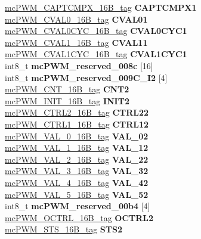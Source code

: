 \begin{DoxyCompactItemize}
\begin{tabbing}
\>\>\mbox{\hyperlink{unionmcPWM__CAPTCMPX__16B__tag}{mcPWM\_CAPTCMPX\_16B\_tag}} {\bfseries CAPTCMPX1}\\
\>\>\mbox{\hyperlink{unionmcPWM__CVAL0__16B__tag}{mcPWM\_CVAL0\_16B\_tag}} {\bfseries CVAL01}\\
\>\>\mbox{\hyperlink{unionmcPWM__CVAL0CYC__16B__tag}{mcPWM\_CVAL0CYC\_16B\_tag}} {\bfseries CVAL0CYC1}\\
\>\>\mbox{\hyperlink{unionmcPWM__CVAL1__16B__tag}{mcPWM\_CVAL1\_16B\_tag}} {\bfseries CVAL11}\\
\>\>\mbox{\hyperlink{unionmcPWM__CVAL1CYC__16B__tag}{mcPWM\_CVAL1CYC\_16B\_tag}} {\bfseries CVAL1CYC1}\\
\>\>int8\_t {\bfseries mcPWM\_reserved\_008c} \mbox{[}16\mbox{]}\\
\>\>int8\_t {\bfseries mcPWM\_reserved\_009C\_I2} \mbox{[}4\mbox{]}\\
\>\>\mbox{\hyperlink{unionmcPWM__CNT__16B__tag}{mcPWM\_CNT\_16B\_tag}} {\bfseries CNT2}\\
\>\>\mbox{\hyperlink{unionmcPWM__INIT__16B__tag}{mcPWM\_INIT\_16B\_tag}} {\bfseries INIT2}\\
\>\>\mbox{\hyperlink{unionmcPWM__CTRL2__16B__tag}{mcPWM\_CTRL2\_16B\_tag}} {\bfseries CTRL22}\\
\>\>\mbox{\hyperlink{unionmcPWM__CTRL1__16B__tag}{mcPWM\_CTRL1\_16B\_tag}} {\bfseries CTRL12}\\
\>\>\mbox{\hyperlink{unionmcPWM__VAL__0__16B__tag}{mcPWM\_VAL\_0\_16B\_tag}} {\bfseries VAL\_02}\\
\>\>\mbox{\hyperlink{unionmcPWM__VAL__1__16B__tag}{mcPWM\_VAL\_1\_16B\_tag}} {\bfseries VAL\_12}\\
\>\>\mbox{\hyperlink{unionmcPWM__VAL__2__16B__tag}{mcPWM\_VAL\_2\_16B\_tag}} {\bfseries VAL\_22}\\
\>\>\mbox{\hyperlink{unionmcPWM__VAL__3__16B__tag}{mcPWM\_VAL\_3\_16B\_tag}} {\bfseries VAL\_32}\\
\>\>\mbox{\hyperlink{unionmcPWM__VAL__4__16B__tag}{mcPWM\_VAL\_4\_16B\_tag}} {\bfseries VAL\_42}\\
\>\>\mbox{\hyperlink{unionmcPWM__VAL__5__16B__tag}{mcPWM\_VAL\_5\_16B\_tag}} {\bfseries VAL\_52}\\
\>\>int8\_t {\bfseries mcPWM\_reserved\_00b4} \mbox{[}4\mbox{]}\\
\>\>\mbox{\hyperlink{unionmcPWM__OCTRL__16B__tag}{mcPWM\_OCTRL\_16B\_tag}} {\bfseries OCTRL2}\\
\>\>\mbox{\hyperlink{unionmcPWM__STS__16B__tag}{mcPWM\_STS\_16B\_tag}} {\bfseries STS2}\\

\end{tabbing}
\end{DoxyCompactItemize}
